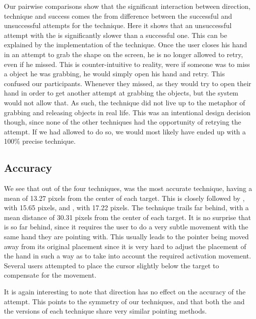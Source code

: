 Our pairwise comparisons show that the significant interaction between direction, technique and success comes the from difference between the successful and unsuccessful attempts for the \grab \pull technique. 
Here it shows that an unsuccessful attempt with the \grab \pull is significantly slower than a successful one. 
This can be explained by the implementation of the technique. 
Once the user closes his hand in an attempt to grab the shape on the screen, he is no longer allowed to retry, even if he missed.
This is counter-intuitive to reality, were if someone was to miss a object he was grabbing, he would simply open his hand and retry.
This confused our participants. 
Whenever they missed, as they would try to open their hand in order to get another attempt at grabbing the objects, but the system would not allow that.
As such, the \grab \pull technique did not live up to the metaphor of grabbing and releasing objects in real life.
This was an intentional design decision though, since none of the other techniques had the opportunity  of retrying the attempt.
If we had allowed \grab \pull to do so, we would most likely have ended up with a 100\% precise technique. 

\subsection{Accuracy}
We see that out of the four techniques, \swipe was the most accurate technique, having a mean of 13.27 pixels from the center of each target. 
This is closely followed by \throw, with 15.65 pixels, and \grab, with 17.22 pixels.
The \tilt technique trails far behind, with a mean distance of 30.31 pixels from the center of each target.   
It is no surprise that \tilt is so far behind, since it requires the user to do a very subtle movement with the same hand they are pointing with.
This usually leads to the pointer being moved away from its original placement since it is very hard to adjust the placement of the hand in such a way as to take into account the required activation movement. 
Several users attempted to place the cursor slightly below the target to compensate for the movement. 

It is again interesting to note that direction has no effect on the accuracy of the attempt. 
This points to the symmetry of our techniques, and that both the \pull and the \push versions of each technique share very similar pointing methods.

